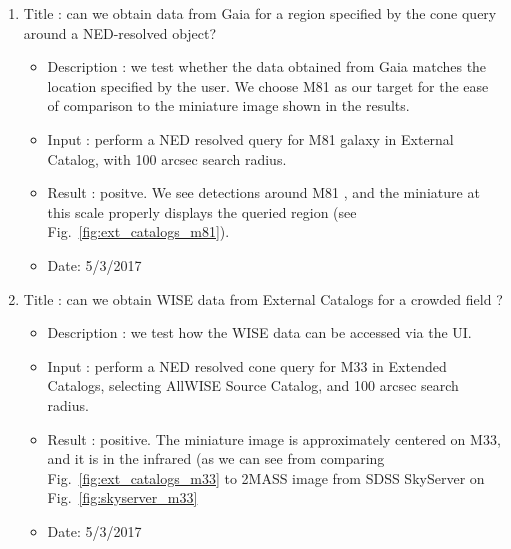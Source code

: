 \documentclass[DM,lsstdraft,toc,usenatbib]{lsstdoc}
\begin{document}
\begin{enumerate}
   \item Title : can we obtain data from Gaia for a region specified by the cone query around a NED-resolved object? 
    \begin{itemize}
      \item Description : we test whether the data obtained from Gaia matches the location specified by the user. We choose M81 as our target for the ease of comparison to the  miniature image shown in the results.  
      \item Input : perform a NED resolved  query for M81 galaxy in External Catalog, with 100 arcsec search radius. 
      \item Result : positve. We see detections around M81 , and the miniature at this scale properly displays the queried region (see Fig.~\ref{fig:ext_catalogs_m81}). 
      \item Date: 5/3/2017
    \end{itemize}

    \item Title : can we obtain WISE data from External Catalogs for a crowded field ? 
    \begin{itemize}
      \item Description : we test how  the WISE data can be accessed via the UI. 
      \item Input : perform a NED resolved  cone query  for M33  in Extended Catalogs, selecting AllWISE Source Catalog, and 100 arcsec search radius.
      \item Result : positive. The miniature image is approximately centered on M33, and it is in the infrared (as we can see from comparing Fig.~\ref{fig:ext_catalogs_m33} to 2MASS image from SDSS SkyServer on Fig.~\ref{fig:skyserver_m33}
      \item Date: 5/3/2017
    \end{itemize}
\end{enumerate}
\end{document}
